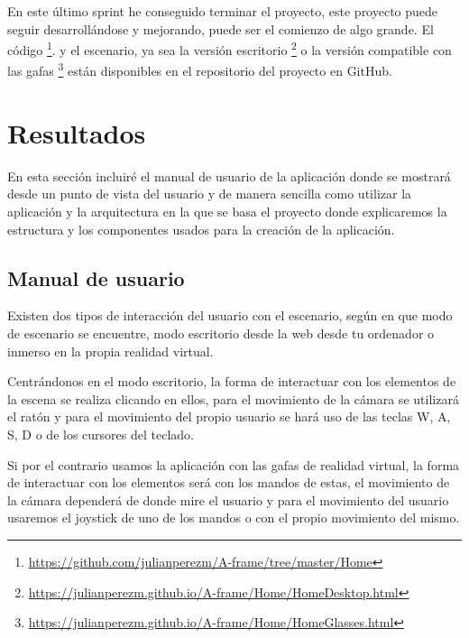 \documentclass[a4paper, 12pt]{book}
\begin{document}
En este último sprint he conseguido terminar el proyecto, este proyecto puede seguir desarrollándose y mejorando, puede ser el comienzo de algo grande. El código \footnote{\url{https://github.com/julianperezm/A-frame/tree/master/Home}}.  y el escenario, ya sea la versión escritorio \footnote{\url{https://julianperezm.github.io/A-frame/Home/HomeDesktop.html}} o la versión compatible con las gafas \footnote{\url{https://julianperezm.github.io/A-frame/Home/HomeGlasses.html}} están disponibles en el repositorio del proyecto en GitHub.


\cleardoublepage
\chapter{Resultados}

En esta sección incluiré el manual de usuario de la aplicación donde se mostrará  desde un punto de vista del usuario y de  manera sencilla como utilizar la aplicación y la arquitectura en la que se basa el proyecto donde explicaremos la estructura y los componentes usados para la creación de la aplicación.

\section{Manual de usuario} 
\label{sec:manual de usuario}

Existen dos tipos de interacción del usuario con el escenario, según en que modo de escenario se encuentre, modo escritorio desde la web desde tu ordenador  o inmerso en la propia realidad virtual.

Centrándonos en el modo escritorio, la forma de interactuar con los elementos de la escena se realiza clicando en ellos, para el movimiento de la cámara se utilizará el ratón y para el movimiento del propio usuario se hará uso de las teclas W, A, S, D o de los cursores del teclado. 

Si por el contrario usamos la aplicación con las gafas de realidad virtual, la forma de interactuar con los elementos será con los mandos de estas, el movimiento de la cámara dependerá de donde mire el usuario y  para el movimiento del usuario usaremos el joystick de uno de los mandos o con el propio movimiento del mismo.
\end{document}
